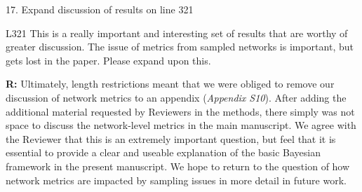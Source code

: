 \documentclass[12pt]{letter}
\newenvironment{refquote}{\bigskip \begin{it}}{\end{it}\smallskip}
\begin{document}
	17. Expand discussion of results on line 321 


		\begin{refquote}
		L321 This is a really important and interesting set of results that are worthy of greater discussion. The issue of metrics from sampled networks is important, but gets lost in the paper. Please expand upon this.
		\end{refquote}


		\textbf{R:} Ultimately, length restrictions meant that we were obliged to remove our discussion of network metrics to an appendix (\emph{Appendix S10}). After adding the additional material requested by Reviewers in the methods, there simply was not space to discuss the network-level metrics in the main manuscript. We agree with the Reviewer that this is an extremely important question, but feel that it is essential to provide a clear and useable explanation of the basic Bayesian framework in the present manuscript. We hope to return to the question of how network metrics are impacted by sampling issues in more detail in future work.


\clearpage

     
\end{document}

